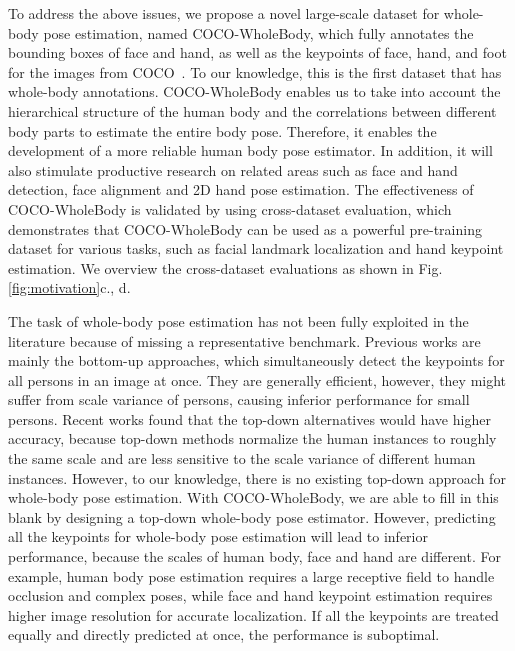 \documentclass[runningheads]{llncs}
\begin{document}
	To address the above issues, we propose a novel large-scale dataset for whole-body pose estimation, named COCO-WholeBody, which fully annotates the bounding boxes of face and hand, as well as the keypoints of face, hand, and foot for the images from COCO~\cite{lin2014microsoft}. To our knowledge, this is the first dataset that has whole-body annotations. COCO-WholeBody enables us to take into account the hierarchical structure of the human body and the correlations between different body parts to estimate the entire body pose. Therefore, it enables the development of a more reliable human body pose estimator. In addition, it will also stimulate productive research on related areas such as face and hand detection, face alignment and 2D hand pose estimation. The effectiveness of COCO-WholeBody is validated by using cross-dataset evaluation, which demonstrates that COCO-WholeBody can be used as a powerful pre-training dataset for various tasks, such as facial landmark localization and hand keypoint estimation. We overview the cross-dataset evaluations as shown in Fig.\ref{fig:motivation}c., d.
	
	The task of whole-body pose estimation has not been fully exploited in the literature because of missing a representative benchmark. Previous works \cite{cao2018openpose,hidalgo2019single} are mainly the bottom-up approaches, which simultaneously detect the keypoints for all persons in an image at once. They are generally efficient, however, they might suffer from scale variance of persons, causing inferior performance for small persons. Recent works \cite{sun2019deep,xiao2018simple} found that the top-down alternatives would have higher accuracy, because top-down methods normalize the human instances to roughly the same scale and are less sensitive to the scale variance of different human instances. However, to our knowledge, there is no existing top-down approach for whole-body pose estimation. With COCO-WholeBody, we are able to fill in this blank by designing a top-down whole-body pose estimator. However, predicting all the keypoints for whole-body pose estimation will lead to inferior performance, because the scales of human body, face and hand are different. For example, human body pose estimation requires a large receptive field to handle occlusion and complex poses, while face and hand keypoint estimation requires higher image resolution for accurate localization. If all the keypoints are treated equally and directly predicted at once, the performance is suboptimal.
	
\end{document}
